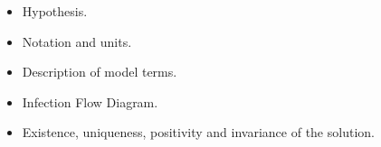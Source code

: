 \begin{itemize}
	\item	
    	Hypothesis.
    \item 
    	Notation and units.
    \item
    	Description of model terms.
    \item
    	Infection Flow Diagram.
    \item 
    	Existence, uniqueness, positivity and invariance of the
        solution.
\end{itemize}